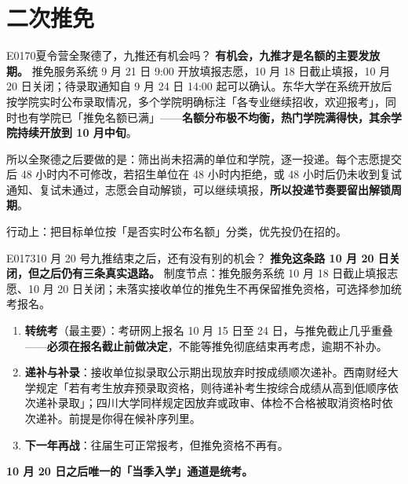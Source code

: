 \section{二次推免}
\begin{qa}{E0170}{夏令营全聚德了，九推还有机会吗？}
\textbf{有机会，九推才是名额的主要发放期。}
推免服务系统 9 月 21 日 9:00 开放填报志愿，10 月 18 日截止填报，10 月 20 日关闭；待录取通知自 9 月 24 日 14:00 起可以确认。东华大学在系统开放后按学院实时公布录取情况，多个学院明确标注「各专业继续招收，欢迎报考」，同时也有学院已「推免名额已满」——\textbf{名额分布极不均衡，热门学院满得快，其余学院持续开放到 10 月中旬}。

所以全聚德之后要做的是：筛出尚未招满的单位和学院，逐一投递。每个志愿提交后 48 小时内不可修改，若招生单位在 48 小时内拒绝，或 48 小时后仍未收到复试通知、复试未通过，志愿会自动解锁，可以继续填报，\textbf{所以投递节奏要留出解锁周期}。

行动上：把目标单位按「是否实时公布名额」分类，优先投仍在招的。
\end{qa}

\begin{qa}{E0173}{10 月 20 号九推结束之后，还有没有别的机会？}
\textbf{推免这条路 10 月 20 日关闭，但之后仍有三条真实退路。}
制度节点：推免服务系统 10 月 18 日截止填报志愿、10 月 20 日关闭；未落实接收单位的推免生不再保留推免资格，可选择参加统考报名。

\begin{enumerate}
  \item \textbf{转统考}（最主要）：考研网上报名 10 月 15 日至 24 日，与推免截止几乎重叠——\textbf{必须在报名截止前做决定}，不能等推免彻底结束再考虑，逾期不补办。
  \item \textbf{递补与补录}：接收单位拟录取公示期出现放弃时按成绩顺次递补。西南财经大学规定「若有考生放弃预录取资格，则待递补考生按综合成绩从高到低顺序依次递补录取」；四川大学同样规定因放弃或政审、体检不合格被取消资格时依次递补。前提是你得在候补序列里。
  \item \textbf{下一年再战}：往届生可正常报考，但推免资格不再有。
\end{enumerate}

\textbf{10 月 20 日之后唯一的「当季入学」通道是统考。}
\end{qa}

